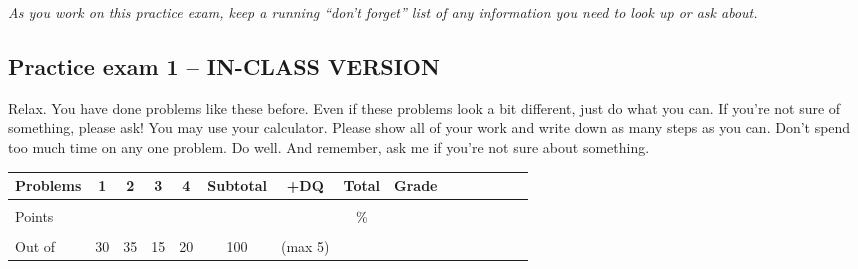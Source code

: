 \documentclass[12pt]{article}
\begin{document}
\emph{As you work on this practice exam, keep a running ``don't forget'' list of any information you need to look up or ask about.}
\bigskip

\subsection*{Practice exam 1 -- IN-CLASS VERSION}
\bigskip

Relax.  You have done problems like these before.  Even if these problems look a bit different, just do what you can.  If you're not sure of something, please ask! You may use your calculator.  Please show all of your work and write down as many steps as you can.  Don't spend too much time on any one problem.  Do well.  And remember, ask me if you're not sure about something.
 
 \begin{center}

\begin{tabular}
{|l|c|c|c|c|c|c|c|c|c|c|c|c||c|c} \hline

 Problems & \hspace{5 pt} 1 \hspace{5 pt}  & \hspace{5 pt} 2 \hspace{5 pt} & \hspace{5 pt} 3 \hspace{5 pt} & \hspace{5 pt} 4 \hspace{5 pt}  & \hspace{5 pt} Subtotal  \hspace{5 pt} & +DQ& Total &\hspace{5 pt} Grade \hspace{5 pt}  \\ \hline
&&&&&&&&\\  
Points &&&&&&&   \hspace{.8in}\% &  \\ 
&&&&&&&& \\  \hline
Out of & 30 & 35 & 15 & 20  &100 & (max 5)& & \\ \hline
\end {tabular}

\end{center}

\vfill

\newpage  %
\end{document}
